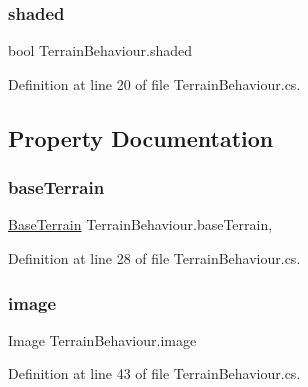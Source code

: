 \subsubsection{\texorpdfstring{shaded}{shaded}}
{\footnotesize\ttfamily bool Terrain\+Behaviour.\+shaded}



Definition at line 20 of file Terrain\+Behaviour.\+cs.



\subsection{Property Documentation}
\mbox{\label{class_terrain_behaviour_aeaebeaa90adc3c4b41853845a54a474e}} 
\subsubsection{\texorpdfstring{baseTerrain}{baseTerrain}}
{\footnotesize\ttfamily \mbox{\hyperlink{class_base_terrain}{Base\+Terrain}} Terrain\+Behaviour.\+base\+Terrain\hspace{0.3cm}{\ttfamily [get]}, {\ttfamily [set]}}



Definition at line 28 of file Terrain\+Behaviour.\+cs.

\mbox{\label{class_terrain_behaviour_a06f02f134baac6f02594037be9bf41d9}} 
\subsubsection{\texorpdfstring{image}{image}}
{\footnotesize\ttfamily Image Terrain\+Behaviour.\+image\hspace{0.3cm}{\ttfamily [get]}}



Definition at line 43 of file Terrain\+Behaviour.\+cs.

\mbox{\label{class_terrain_behaviour_ada11b3216887b92ca5f1de3e7165b4c2}} 
